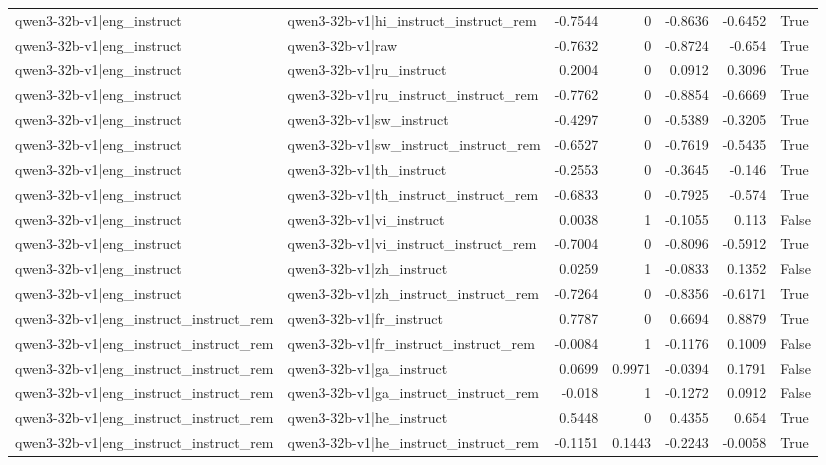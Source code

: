 \begin{table}
\begin{tabular}{l l r r r r l}
qwen3-32b-v1|eng_instruct & qwen3-32b-v1|hi_instruct_instruct_rem & -0.7544 & 0 & -0.8636 & -0.6452 & True \\
qwen3-32b-v1|eng_instruct & qwen3-32b-v1|raw & -0.7632 & 0 & -0.8724 & -0.654 & True \\
qwen3-32b-v1|eng_instruct & qwen3-32b-v1|ru_instruct & 0.2004 & 0 & 0.0912 & 0.3096 & True \\
qwen3-32b-v1|eng_instruct & qwen3-32b-v1|ru_instruct_instruct_rem & -0.7762 & 0 & -0.8854 & -0.6669 & True \\
qwen3-32b-v1|eng_instruct & qwen3-32b-v1|sw_instruct & -0.4297 & 0 & -0.5389 & -0.3205 & True \\
qwen3-32b-v1|eng_instruct & qwen3-32b-v1|sw_instruct_instruct_rem & -0.6527 & 0 & -0.7619 & -0.5435 & True \\
qwen3-32b-v1|eng_instruct & qwen3-32b-v1|th_instruct & -0.2553 & 0 & -0.3645 & -0.146 & True \\
qwen3-32b-v1|eng_instruct & qwen3-32b-v1|th_instruct_instruct_rem & -0.6833 & 0 & -0.7925 & -0.574 & True \\
qwen3-32b-v1|eng_instruct & qwen3-32b-v1|vi_instruct & 0.0038 & 1 & -0.1055 & 0.113 & False \\
qwen3-32b-v1|eng_instruct & qwen3-32b-v1|vi_instruct_instruct_rem & -0.7004 & 0 & -0.8096 & -0.5912 & True \\
qwen3-32b-v1|eng_instruct & qwen3-32b-v1|zh_instruct & 0.0259 & 1 & -0.0833 & 0.1352 & False \\
qwen3-32b-v1|eng_instruct & qwen3-32b-v1|zh_instruct_instruct_rem & -0.7264 & 0 & -0.8356 & -0.6171 & True \\
qwen3-32b-v1|eng_instruct_instruct_rem & qwen3-32b-v1|fr_instruct & 0.7787 & 0 & 0.6694 & 0.8879 & True \\
qwen3-32b-v1|eng_instruct_instruct_rem & qwen3-32b-v1|fr_instruct_instruct_rem & -0.0084 & 1 & -0.1176 & 0.1009 & False \\
qwen3-32b-v1|eng_instruct_instruct_rem & qwen3-32b-v1|ga_instruct & 0.0699 & 0.9971 & -0.0394 & 0.1791 & False \\
qwen3-32b-v1|eng_instruct_instruct_rem & qwen3-32b-v1|ga_instruct_instruct_rem & -0.018 & 1 & -0.1272 & 0.0912 & False \\
qwen3-32b-v1|eng_instruct_instruct_rem & qwen3-32b-v1|he_instruct & 0.5448 & 0 & 0.4355 & 0.654 & True \\
qwen3-32b-v1|eng_instruct_instruct_rem & qwen3-32b-v1|he_instruct_instruct_rem & -0.1151 & 0.1443 & -0.2243 & -0.0058 & True \\

\end{tabular}
\end{table}
